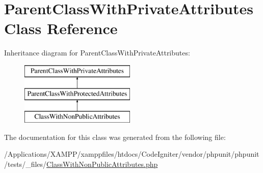 \hypertarget{class_parent_class_with_private_attributes}{}\section{Parent\+Class\+With\+Private\+Attributes Class Reference}
\label{class_parent_class_with_private_attributes}
Inheritance diagram for Parent\+Class\+With\+Private\+Attributes\+:\begin{figure}[H]
\begin{center}
\leavevmode
\includegraphics[height=3.000000cm]{class_parent_class_with_private_attributes}
\end{center}
\end{figure}


The documentation for this class was generated from the following file\+:\begin{DoxyCompactItemize}
\item 
/\+Applications/\+X\+A\+M\+P\+P/xamppfiles/htdocs/\+Code\+Igniter/vendor/phpunit/phpunit/tests/\+\_\+files/\mbox{\hyperlink{_class_with_non_public_attributes_8php}{Class\+With\+Non\+Public\+Attributes.\+php}}\end{DoxyCompactItemize}
